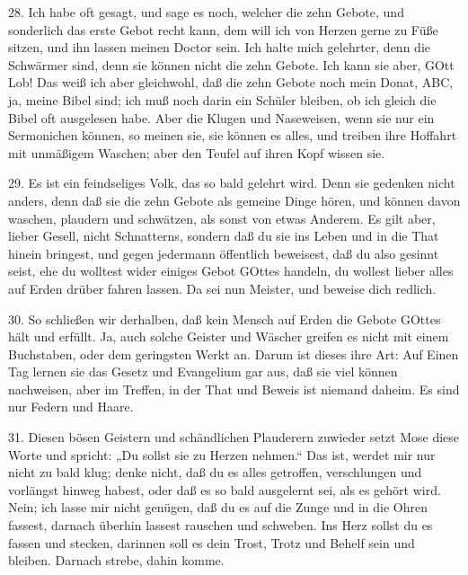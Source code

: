 28. Ich habe oft gesagt, und sage es noch, welcher die zehn Gebote, und sonderlich das erste Gebot recht kann, dem will ich von Herzen gerne zu Füße sitzen, und ihn lassen meinen Doctor sein. Ich halte mich gelehrter, denn die Schwärmer sind, denn sie können nicht die zehn Gebote. Ich kann sie aber, GOtt Lob! Das weiß ich aber gleichwohl, daß die zehn Gebote noch mein Donat, ABC, ja, meine Bibel sind; ich muß noch darin ein Schüler bleiben, ob ich gleich die Bibel oft ausgelesen habe. Aber die Klugen und Naseweisen, wenn sie nur ein Sermonichen können, so meinen sie, sie können es alles, und treiben ihre Hoffahrt mit unmäßigem Waschen; aber den Teufel auf ihren Kopf wissen sie.

29. Es ist ein feindseliges Volk, das so bald gelehrt wird. Denn sie gedenken nicht anders, denn daß sie die zehn Gebote als gemeine Dinge hören, und können davon waschen, plaudern und schwätzen, als sonst von etwas Anderem. Es gilt aber, lieber Gesell, nicht Schnatterns, sondern daß du sie ins Leben und in die That hinein bringest, und gegen jedermann öffentlich beweisest, daß du also gesinnt seist, ehe du wolltest wider einiges Gebot GOttes handeln, du wollest lieber alles auf Erden drüber fahren lassen. Da sei nun Meister, und beweise dich redlich.

30. So schließen wir derhalben, daß kein Mensch auf Erden die Gebote GOttes hält und erfüllt. Ja, auch solche Geister und Wäscher greifen es nicht mit einem Buchstaben, oder dem geringsten Werkt an. Darum ist dieses ihre Art: Auf Einen Tag lernen sie das Gesetz und Evangelium gar aus, daß sie viel können nachweisen, aber im Treffen, in der That und Beweis ist niemand daheim. Es sind nur Federn und Haare.

31. Diesen bösen Geistern und schändlichen Plauderern zuwieder setzt Mose diese Worte und spricht: „Du sollst sie zu Herzen nehmen.“ Das ist, werdet mir nur nicht zu bald klug; denke nicht, daß du es alles getroffen, verschlungen und vorlängst hinweg habest, oder daß es so bald ausgelernt sei, als es gehört wird. Nein; ich lasse mir nicht genügen, daß du es auf die Zunge und in die Ohren fassest, darnach überhin lassest rauschen und schweben. Ins Herz sollst du es fassen und stecken, darinnen soll es dein Trost, Trotz und Behelf sein und bleiben. Darnach strebe, dahin komme.

